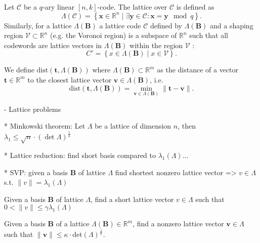 \documentclass[
  a4paper,  %
  twoside,  %
  bibliography=totoc,
  headsepline,
  cleardoublepage=empty,
  parskip=half,
  draft=false
]{scrbook}
\begin{document}
Let $\mathcal{C}$ be a $q$-ary linear $[n, k]$-code. The lattice over $\mathcal{C}$ is defined as %
\begin{equation}
  \Lambda(\mathcal{C}) = \left\{ \mathbf{x} \in \mathbb{R}^n \mid \exists \mathbf{y} \in \mathcal{C} : \mathbf{x} = \mathbf{y} \mod q  \right\}.
\end{equation} %
Similarly, for a lattice $\Lambda(\mathbf{B})$ a lattice code $\mathcal{C}$ defined by $\Lambda(\mathbf{B})$ and a shaping region $\mathcal{V} \subset \mathbb{R}^n$ (e.g. the Voronoi region) is a subspace of $\mathbb{R}^n$ such that all codewords are lattice vectors in $\Lambda(\mathbf{B})$ within the region $\mathcal{V}$ \cite{SFS08}:
\begin{equation}
  C' = \left\{ x \in \Lambda(\mathbf{B}) \mid x \in \mathcal{V} \right\}.
\end{equation} %



We define $\text{dist}(\mathbf{t}, \Lambda(\mathbf{B}))$ where $\Lambda(\mathbf{B}) \subset \mathbb{R}^m$ as the distance of a vector $\mathbf{t} \in \mathbb{R}^m$ to the closest lattice vector $\mathbf{v} \in \Lambda(\mathbf{B})$, i.e.
\begin{equation}\label{eq:dist}
  \text{dist}(\mathbf{t}, \Lambda(\mathbf{B})) = \min_{\mathbf{v} \in \Lambda(\mathbf{B})}\|\mathbf{t} -  \mathbf{v}\|.
\end{equation}




- Lattice problems

* Minkowski theorem: Let $\Lambda$ be a lattice of dimension $n$, then $\lambda_1 \leq \sqrt{n} \cdot (\det \Lambda)^{\frac{1}{n}}$

* Lattice reduction: find short basis compared to $\lambda_1(\Lambda)$...

* SVP: given a basis $\mathbf{B}$ of lattice $\Lambda$ find shortest nonzero lattice vector =>  $v\in \Lambda$ s.t. $\| v \| = \lambda_1(\Lambda)$

\begin{definition} \label{def:gammaSVP} %
  Given a basis $\mathbf{B}$ of lattice $\Lambda$, find a short lattice vector $v\in \Lambda$ such that $0 < \| v \| \leq \gamma \lambda_1(\Lambda)$
\end{definition}

\begin{definition} \label{def:kappaHSVP} %
  Given a basis $\mathbf{B}$ of a lattice $\Lambda(\mathbf{B}) \in \mathbb{R}^m$, find a nonzero lattice vector $\mathbf{v} \in \Lambda$ such that $\| \mathbf{v} \| \leq \kappa \cdot \text{det}(\Lambda)^{\frac{1}{n}}$.
\end{definition}
\end{document}
